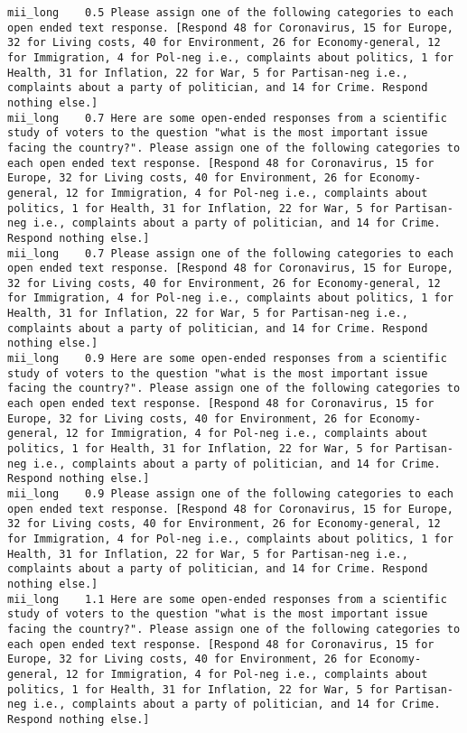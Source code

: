 \begin{lstlisting}[label=lst:promptvariants]
mii_long	0.5	Please assign one of the following categories to each open ended text response. [Respond 48 for Coronavirus, 15 for Europe, 32 for Living costs, 40 for Environment, 26 for Economy-general, 12 for Immigration, 4 for Pol-neg i.e., complaints about politics, 1 for Health, 31 for Inflation, 22 for War, 5 for Partisan-neg i.e., complaints about a party of politician, and 14 for Crime. Respond nothing else.]
mii_long	0.7	Here are some open-ended responses from a scientific study of voters to the question "what is the most important issue facing the country?". Please assign one of the following categories to each open ended text response. [Respond 48 for Coronavirus, 15 for Europe, 32 for Living costs, 40 for Environment, 26 for Economy-general, 12 for Immigration, 4 for Pol-neg i.e., complaints about politics, 1 for Health, 31 for Inflation, 22 for War, 5 for Partisan-neg i.e., complaints about a party of politician, and 14 for Crime. Respond nothing else.]
mii_long	0.7	Please assign one of the following categories to each open ended text response. [Respond 48 for Coronavirus, 15 for Europe, 32 for Living costs, 40 for Environment, 26 for Economy-general, 12 for Immigration, 4 for Pol-neg i.e., complaints about politics, 1 for Health, 31 for Inflation, 22 for War, 5 for Partisan-neg i.e., complaints about a party of politician, and 14 for Crime. Respond nothing else.]
mii_long	0.9	Here are some open-ended responses from a scientific study of voters to the question "what is the most important issue facing the country?". Please assign one of the following categories to each open ended text response. [Respond 48 for Coronavirus, 15 for Europe, 32 for Living costs, 40 for Environment, 26 for Economy-general, 12 for Immigration, 4 for Pol-neg i.e., complaints about politics, 1 for Health, 31 for Inflation, 22 for War, 5 for Partisan-neg i.e., complaints about a party of politician, and 14 for Crime. Respond nothing else.]
mii_long	0.9	Please assign one of the following categories to each open ended text response. [Respond 48 for Coronavirus, 15 for Europe, 32 for Living costs, 40 for Environment, 26 for Economy-general, 12 for Immigration, 4 for Pol-neg i.e., complaints about politics, 1 for Health, 31 for Inflation, 22 for War, 5 for Partisan-neg i.e., complaints about a party of politician, and 14 for Crime. Respond nothing else.]
mii_long	1.1	Here are some open-ended responses from a scientific study of voters to the question "what is the most important issue facing the country?". Please assign one of the following categories to each open ended text response. [Respond 48 for Coronavirus, 15 for Europe, 32 for Living costs, 40 for Environment, 26 for Economy-general, 12 for Immigration, 4 for Pol-neg i.e., complaints about politics, 1 for Health, 31 for Inflation, 22 for War, 5 for Partisan-neg i.e., complaints about a party of politician, and 14 for Crime. Respond nothing else.]

\end{lstlisting}
